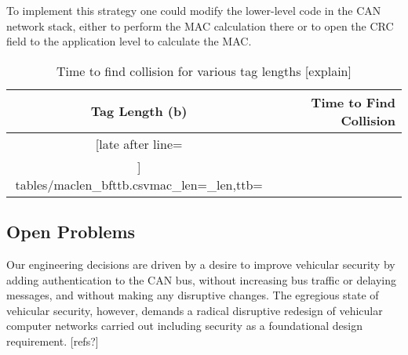 
To implement this strategy one could modify the lower-level code in the CAN network stack, 
either to perform the MAC calculation there 
or to open the CRC field to the application level to calculate the MAC.


	\begin{table}	
	\centering
	\caption{Time to find collision for various tag lengths [explain]}\label{tab-taglength}
	\vspace{8pt}
	\begin{tabular}{c|r}%
	\bfseries Tag Length (b) & \bfseries Time to Find Collision\\\hline \csvreader[late after line=\\]%
		{tables/maclen_bfttb.csv}{mac_len=\mac_len,ttb=\ttb}%
		{\mac_len & \ttb}%
	\end{tabular}
	\end{table}
	



\subsection{Open Problems}
\label{open}

Our engineering decisions are driven by a desire to improve vehicular security by adding authentication
to the CAN bus, without increasing bus traffic or delaying messages, and without making any
disruptive changes.  The egregious state of vehicular security, however, demands a radical disruptive
redesign of vehicular computer networks carried out including security as a foundational design
requirement. [refs?]

